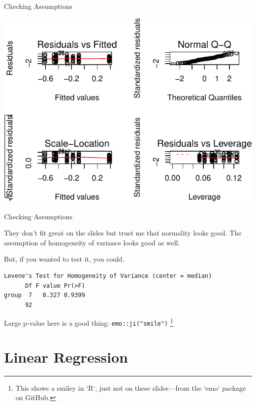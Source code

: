 \begin{frame}{Checking Assumptions}

\includegraphics{04_BasicAnalyses_files/figure-beamer/unnamed-chunk-17-1.pdf}

\end{frame}

\begin{frame}[fragile]{Checking Assumptions}

They don't fit great on the slides but trust me that normality looks
good. The assumption of homogeneity of variance looks good as well.

But, if you wanted to test it, you could.

\begin{Shaded}
\begin{Highlighting}[]
\end{Highlighting}
\end{Shaded}

\begin{verbatim}
Levene's Test for Homogeneity of Variance (center = median)
      Df F value Pr(>F)
group  7   0.327 0.9399
      92               
\end{verbatim}

Large p-value here is a good thing: \texttt{emo::ji("smile")}
\footnote{This shows a smiley in `R`, just not on these slides---from the `emo` package on GitHub.}

\end{frame}

\section{Linear Regression}\label{linear-regression}

